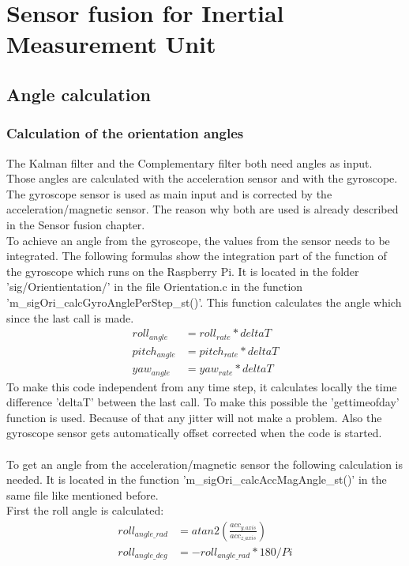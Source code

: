 
\chapter{Sensor fusion for Inertial Measurement Unit}
\label{sec:sensorFusion}

\section{Angle calculation}
\label{sec:angle}

\subsection{Calculation of the orientation angles}
\label{subsec:CalcAngle}
The Kalman filter and the Complementary filter both need angles as input. Those angles are calculated with the acceleration sensor and with the gyroscope. The gyroscope sensor is used as main input and is corrected by the acceleration/magnetic sensor. The reason why both are used is already described in the Sensor fusion chapter.\\
To achieve an angle from the gyroscope, the values from the sensor needs to be integrated. The following formulas show the integration part of the function of the gyroscope which runs on the Raspberry Pi. It is located in the folder 'sig/Orientientation/' in the file Orientation.c in the function 'm\_sigOri\_calcGyroAnglePerStep\_st()'. This function calculates the angle which since the last call is made.
\begin{align}
roll_{angle}&=roll_{rate}*deltaT\\
pitch_{angle}&=pitch_{rate}*deltaT\\
yaw_{angle}&=yaw_{rate}*deltaT
\end{align}
To make this code independent from any time step, it calculates locally the time difference 'deltaT' between the last call. To make this possible the 'gettimeofday' function is used. Because of that any jitter will not make a problem. Also the gyroscope sensor gets automatically offset corrected when the code is started.\\\\
To get an angle from the acceleration/magnetic sensor the following calculation is needed. It is located in the function 'm\_sigOri\_calcAccMagAngle\_st()' in the same file like mentioned before.\\
First the roll angle is calculated:
\begin{align}
roll_{angle\_rad}&=atan2\left(\frac{acc_{y\_axis}}{acc_{z\_axis}}\right)\\
		roll_{angle\_deg}&=-roll_{angle\_rad}*180/Pi
\end{align}

